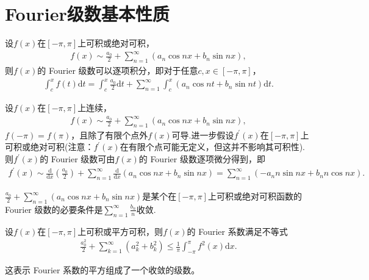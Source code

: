 \documentclass[../../main.tex]{subfiles}
\begin{document}
\section{Fourier级数基本性质}

\begin{theorem}[Fourier级数的逐项积分定理]\label{theorem:Fourier级数的逐项积分定理}
设$f(x)$在$[-\pi,\pi]$上可积或绝对可积，
\begin{align*}
f(x)\sim\frac{a_0}{2}+\sum_{n = 1}^{\infty}(a_n\cos nx + b_n\sin nx),
\end{align*}
则$f(x)$的 Fourier 级数可以逐项积分，即对于任意$c,x\in[-\pi,\pi]$，
\begin{align*}
\int_{c}^{x}f(t)\mathrm{d}t=\int_{c}^{x}\frac{a_0}{2}\mathrm{d}t+\sum_{n = 1}^{\infty}\int_{c}^{x}(a_n\cos nt + b_n\sin nt)\mathrm{d}t.
\end{align*}
\end{theorem}

\begin{theorem}[Fourier级数的逐项微分定理]\label{theorem:Fourier级数的逐项微分定理}
设$f(x)$在$[-\pi,\pi]$上连续，
\begin{align*}
f(x)\sim\frac{a_0}{2}+\sum_{n = 1}^{\infty}(a_n\cos nx + b_n\sin nx),
\end{align*}
$f(-\pi)=f(\pi)$，且除了有限个点外$f(x)$可导.进一步假设$f^{\prime}(x)$在$[-\pi,\pi]$上可积或绝对可积(注意：$f^{\prime}(x)$在有限个点可能无定义，但这并不影响其可积性). 则$f^{\prime}(x)$的 Fourier 级数可由$f(x)$的 Fourier 级数逐项微分得到，即
\begin{align*}
f^{\prime}(x)\sim\frac{\mathrm{d}}{\mathrm{d}x}\left(\frac{a_0}{2}\right)+\sum_{n = 1}^{\infty}\frac{\mathrm{d}}{\mathrm{d}x}(a_n\cos nx + b_n\sin nx)=\sum_{n = 1}^{\infty}(-a_nn\sin nx + b_nn\cos nx).
\end{align*}
\end{theorem}

\begin{corollary}
$\frac{a_0}{2}+\sum_{n = 1}^{\infty}(a_n\cos nx + b_n\sin nx)$是某个在$[-\pi,\pi]$上可积或绝对可积函数的 Fourier 级数的必要条件是$\sum_{n = 1}^{\infty}\frac{b_n}{n}$收敛. 
\end{corollary}

\begin{theorem}[Bessel不等式]\label{theorem:Bessel不等式}
设$f(x)$在$[-\pi,\pi]$上可积或平方可积，则$f(x)$的 Fourier 系数满足不等式
\begin{align*}
\frac{a_0^2}{2}+\sum_{k = 1}^{\infty}(a_k^2 + b_k^2)\leq\frac{1}{\pi}\int_{-\pi}^{\pi}f^2(x)\mathrm{d}x.
\end{align*}
\end{theorem}
\begin{note}
这表示 Fourier 系数的平方组成了一个收敛的级数。
\end{note}
\end{document}
